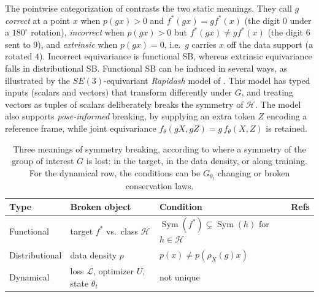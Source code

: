 \documentclass[mathematics,review,submit,moreauthors]{Definitions/mdpi}
\begin{document}
The pointwise categorization of \citet{wang2023a} contrasts the two static meanings.
They call $g$ \emph{correct} at a point $x$ when $p(gx)>0$ and $f^*(gx)=gf^*(x)$ (the digit $0$ under a $180^\circ$ rotation), \emph{incorrect} when $p(gx)>0$ but $f^*(gx)\neq gf^*(x)$ (the digit $6$ sent to $9$), and \emph{extrinsic} when $p(gx)=0$, i.e.\ $g$ carries $x$ off the data support (a rotated $4$).
Incorrect equivariance is functional SB, whereas extrinsic equivariance falls in distributional SB.
Functional SB can be induced in several ways, as illustrated by the $SE(3)$-equivariant \emph{Rapidash} model of \citet{vadgama2025}.
This model has typed inputs (scalars and vectors) that transform differently under $G$, and treating vectors as tuples of scalars deliberately breaks the symmetry of $\mathcal{H}$.
The model also supports \emph{pose-informed} breaking, by supplying an extra token $Z$ encoding a reference frame, while joint equivariance $f_\theta(gX,gZ)=g\,f_\theta(X,Z)$ is retained.

\begin{table}[ht]
    \centering
    \begin{tabularx}{\textwidth}{|l|l|>{\raggedright\arraybackslash}X|>{\raggedright\arraybackslash}X|}
        \hline
        \textbf{Type} & \textbf{Broken object} & \textbf{Condition} & \textbf{Refs} \\
        \hline
        Functional & target $f^*$ vs.\ class $\mathcal{H}$ & $\operatorname{Sym}(f^*)\subsetneq\operatorname{Sym}(h)$ for $h\in \mathcal{H}$ & \citep{wang2023a,zhang2019p3icml,smidt2021prr,lawrence2024,goel2025} \\
        \hline
        Distributional & data density $p$ & $p(x)\neq p(\rho_X(g)x)$ & \citep{lawrence2026,rygiel2026,chen2020,urbano2026} \\
        \hline
        Dynamical & loss $\mathcal{L}$, optimizer $U$, state $\theta_t$ & not unique & \citep{kunin2020,tanaka2021,ziyin2025,arjevani2023} \\
        \hline
    \end{tabularx}
    \caption{Three meanings of symmetry breaking, according to where a symmetry of the group of interest $G$ is lost: in the target, in the data density, or along training.
    For the dynamical row, the conditions can be $G_{\theta_t}$ changing or broken conservation laws.}
    \label{table:symmetry-breaking}
\end{table}
\end{document}
